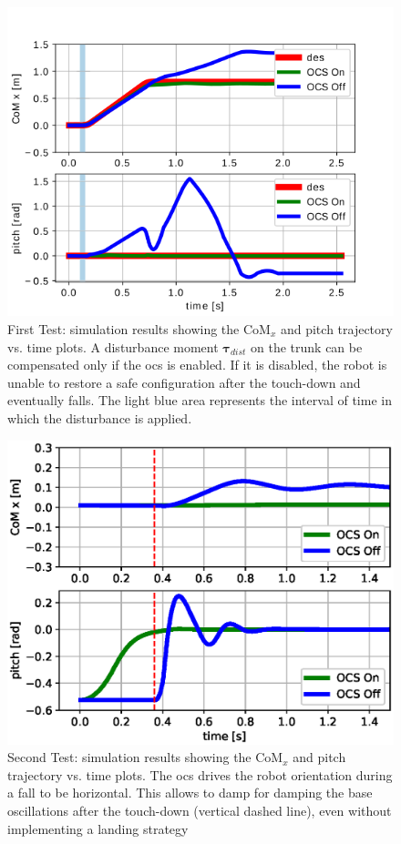 \documentclass[sensors,article,submit,pdftex,moreauthors]{Definitions/mdpi}
\begin{document}
\begin{figure}[t!]
	\centering
	\includegraphics[width=.7\linewidth]{figures/drawing.png}
	\caption{\small First Test: simulation results showing the $\mathrm{CoM}_x$ and pitch trajectory vs. time plots. A disturbance moment $\bm{\tau}_{dist}$ on the trunk can be compensated only if the \gls{ocs} is enabled. If it is disabled, the robot is unable to restore a safe configuration after the touch-down and eventually falls. The light blue area represents the interval of time in which the disturbance is applied.}
	\label{fig:fw_jump}
\end{figure}
\begin{figure}[H]
	\centering
	\includegraphics[width=.7\linewidth]{figures/fall_plot.eps}
	\caption{\small Second Test: simulation results showing the $\mathrm{CoM}_x$ and pitch trajectory vs. time plots. The \gls{ocs} drives the robot orientation during a fall to be horizontal. This allows to damp for damping the base oscillations after the touch-down (vertical dashed line), even without implementing a landing strategy}
	\label{fig:fall_plot}
\end{figure}
\end{document}
